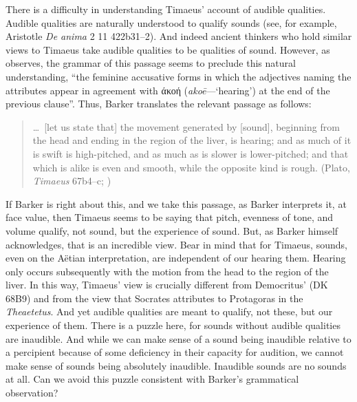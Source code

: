 There is a difficulty in understanding Timaeus' account of audible qualities. Audible qualities are naturally understood to qualify sounds (see, for example, Aristotle \emph{De anima} 2 11 422b31–2). And indeed ancient thinkers who hold similar views to Timaeus take audible qualities to be qualities of sound. However, as \citet[87--88]{Barker:2000dy} observes, the grammar of this passage seems to preclude this natural understanding, ``the feminine accusative forms in which the adjectives naming the attributes appear in agreement with {\sbl άκοή} (\emph{akoē}---`hearing') at the end of the previous clause''. Thus, Barker translates the relevant passage as follows:
\begin{quote}
	\ldots\ [let us state that] the movement generated by [sound], beginning from the head and ending in the region of the liver, is hearing; and as much of it is swift is high-pitched, and as much as is slower is lower-pitched; and that which is alike is even and smooth, while the opposite kind is rough. (Plato, \emph{Timaeus} 67b4--c; \citealt[98 n4]{Barker:2000dy}) 
\end{quote}
If Barker is right about this, and we take this passage, as Barker interprets it, at face value, then Timaeus seems to be saying that pitch, evenness of tone, and volume qualify, not sound, but the experience of sound. But, as Barker himself acknowledges, that is an incredible view. Bear in mind that for Timaeus, sounds, even on the Aëtian interpretation, are independent of our hearing them. Hearing only occurs subsequently with the motion from the head to the region of the liver. In this way, Timaeus' view is crucially different from Democritus' (DK 68B9) and from the view that Socrates attributes to Protagoras in the \emph{Theaetetus}. And yet audible qualities are meant to qualify, not these, but our experience of them. There is a puzzle here, for sounds without audible qualities are inaudible. And while we can make sense of a sound being inaudible relative to a percipient because of some deficiency in their capacity for audition, we cannot make sense of sounds being absolutely inaudible. Inaudible sounds are no sounds at all. Can we avoid this puzzle consistent with Barker's grammatical observation?

